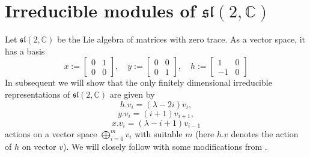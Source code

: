 \documentclass[10pt]{article} %
\theoremstyle{remark}
\newcommand{\sltwo}{\mathfrak{sl}(2,\mathbb{C})}
\begin{document}
\section{Irreducible modules of $\mathfrak{sl}(2,\mathbb{C})$}
Let $\mathfrak{sl}(2,\mathbb{C})$ be the Lie algebra of matrices with zero trace. As a vector space, it has a basis
\[	x:=\begin{bmatrix}0&1\\0&0\end{bmatrix},\quad
	y:=\begin{bmatrix}0&0\\0&1\end{bmatrix},\quad
	h:=\begin{bmatrix}1&0\\-1&0\end{bmatrix}\]
In subsequent we will show that the only finitely dimensional irreducible representations of $\sltwo$ are given by
\[h.v_i=(\lambda-2i)v_i,\]\[y.v_i=(i+1)v_{i+1},\]\[x.v_i=(\lambda-i+1)v_{i-1}\]
actions on a vector space $\bigoplus_{i=0}^mv_i$ with suitable $m$ (here $h.v$ denotes the action of $h$ on vector $v$).
We will closely follow \cite{humphreys} with some modifications from \cite{neunhoffer}.
\end{document}
